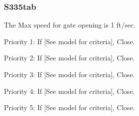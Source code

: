 \clearpage
\subsubsection{S335tab}

The Max speed for gate opening is 1 ft/sec.

\begin{packed_items}
\item Priority 1: If \textcolor[rgb]{1.00,0.00,0.00}{[See model for criteria]}, Close.
\item Priority 2: If \textcolor[rgb]{1.00,0.00,0.00}{[See model for criteria]}, Close.
\item Priority 3: If \textcolor[rgb]{1.00,0.00,0.00}{[See model for criteria]}, Close.
\item Priority 4: If \textcolor[rgb]{1.00,0.00,0.00}{[See model for criteria]}, Close.
\item Priority 5: If \textcolor[rgb]{1.00,0.00,0.00}{[See model for criteria]}, Close.
\end{packed_items}


%
%
%
%



